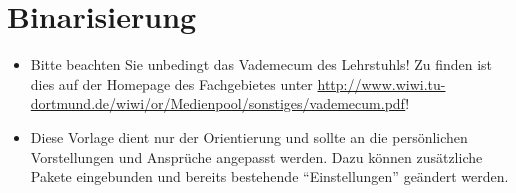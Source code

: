 \chapter{Binarisierung}
\begin{itemize}
    \item Bitte beachten Sie unbedingt das Vademecum des Lehrstuhls! Zu finden ist dies auf der Homepage des Fachgebietes unter \url{http://www.wiwi.tu-dortmund.de/wiwi/or/Medienpool/sonstiges/vademecum.pdf}!
    \item Diese Vorlage dient nur der Orientierung und sollte an die persönlichen Vorstellungen und Ansprüche angepasst werden. Dazu können zusätzliche Pakete eingebunden und bereits bestehende "`Einstellungen"' geändert werden.
\end{itemize}


